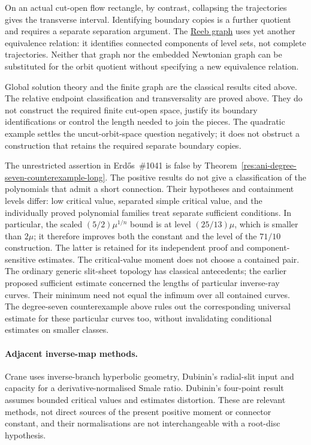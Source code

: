 On an actual cut-open flow rectangle, by contrast, collapsing the
trajectories gives the transverse interval. Identifying boundary copies
is a further quotient and requires a separate separation argument.
The \href{https://arxiv.org/abs/1902.08841v5}{Reeb graph} uses yet another
equivalence relation: it identifies connected components of level sets,
not complete trajectories. Neither that graph nor the embedded Newtonian
graph can be substituted for the orbit quotient without specifying a
new equivalence relation.

Global solution theory and the finite graph are the classical results
cited above. The relative endpoint classification and transversality are proved
above. They do not construct the required finite cut-open space, justify
its boundary identifications or control the length needed to join the
pieces. The quadratic example settles
the uncut-orbit-space question negatively; it does not obstruct a
construction that retains the required separate boundary copies.

The unrestricted assertion in Erd\H{o}s~\#1041 is false by
Theorem~\ref{res:ani-degree-seven-counterexample-long}. The positive
results do not give a classification of the polynomials that admit a
short connection. Their hypotheses and containment levels differ:
low critical value, separated simple critical value, and the individually
proved polynomial families treat separate sufficient conditions.  In particular, the scaled $(5/2)\mu^{1/n}$ bound is at
level $(25/13)\mu$, which is smaller than $2\mu$; it therefore improves
both the constant and the level of the $71/10$ construction.  The latter
is retained for its independent proof and component-sensitive estimates.
The critical-value moment does not choose a contained pair.
The ordinary generic slit-sheet topology has classical antecedents; the
earlier proposed sufficient estimate concerned the lengths of particular
inverse-ray curves. Their minimum need not equal the infimum over all
contained curves. The degree-seven counterexample above rules out the corresponding universal
estimate for these particular curves too, without invalidating conditional
estimates on smaller classes.

\paragraph{Adjacent inverse-map methods.}
Crane \cite[Lemma~2.1, Theorem~2.2 and \S\S3--4]{crane2007smale}
uses inverse-branch hyperbolic geometry, Dubinin's radial-slit input and
capacity for a derivative-normalised Smale ratio.  Dubinin's four-point
result \cite[Theorem~1 and Corollary~4]{dubinin2013fourpoint} assumes
bounded critical values and estimates distortion.  These are relevant
methods, not direct sources of the present positive moment or connector
constant, and their normalisations are not interchangeable with a root-disc
hypothesis.

